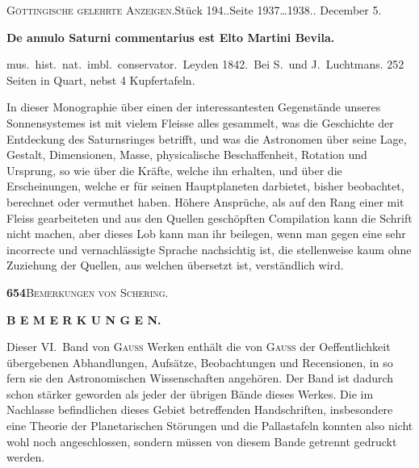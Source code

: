 \documentclass[12pt,a4paper]{article}
\newcommand{\anzeigeheading}[4]{%
    \begin{center}
    \small\textsc{G\"ottingische gelehrte Anzeigen.}\quad St\"uck #1.\quad Seite #2.\quad #3
    \end{center}
    \vspace{-2mm}
    \begin{center}\small\textbf{#4}\end{center}
    \vspace{2mm}
}
\begin{document}
\anzeigeheading{194.}{1937\dots 1938.}{1842 December 5.}{De annulo Saturni commentarius est Elto Martini Bevila.}

\noindent\small mus.\ hist.\ nat.\ imbl.\ conservator.\ Leyden 1842.\ Bei S.\ und J.\ Luchtmans. 252 Seiten in Quart, nebst 4 Kupfertafeln.

\vspace{2mm}

In dieser Monographie \"uber einen der interessantesten Gegenst\"ande unseres Sonnensystemes ist mit vielem Fleisse alles gesammelt, was die Geschichte der Entdeckung des Saturnsringes betrifft, und was die Astronomen \"uber seine Lage, Gestalt, Dimensionen, Masse, physicalische Beschaffenheit, Rotation und Ursprung, so wie \"uber die Kr\"afte, welche ihn erhalten, und \"uber die Erscheinungen, welche er f\"ur seinen Hauptplaneten darbietet, bisher beobachtet, berechnet oder vermuthet haben. H\"ohere Anspr\"uche, als auf den Rang einer mit Fleiss gearbeiteten und aus den Quellen gesch\"opften Compilation kann die Schrift nicht machen, aber dieses Lob kann man ihr beilegen, wenn man gegen eine sehr incorrecte und vernachl\"assigte Sprache nachsichtig ist, die stellenweise kaum ohne Zuziehung der Quellen, aus welchen \"ubersetzt ist, verst\"andlich wird.

\newpage

\begin{center}\small\textbf{654}\quad\textsc{Bemerkungen von Schering.}\end{center}

\begin{center}
\Large\textbf{B E M E R K U N G E N.}
\end{center}

\vspace{0.5cm}

Dieser \textsc{VI.}\ Band von \textsc{Gauss} Werken enth\"alt die von \textsc{Gauss} der Oeffentlichkeit \"ubergebenen Abhandlungen, Aufs\"atze, Beobachtungen und Recensionen, in so fern sie den Astronomischen Wissenschaften angeh\"oren. Der Band ist dadurch schon st\"arker geworden als jeder der \"ubrigen B\"ande dieses Werkes. Die im Nachlasse befindlichen dieses Gebiet betreffenden Handschriften, insbesondere eine Theorie der Planetarischen St\"orungen und die Pallastafeln konnten also nicht wohl noch angeschlossen, sondern m\"ussen von diesem Bande getrennt gedruckt werden.
\end{document}
